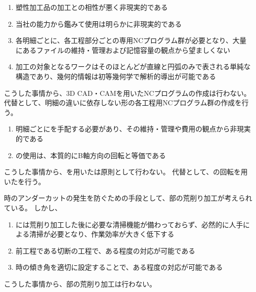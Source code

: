 \begin{enumerate}[label*=\alph*)]
\item {}塑性加工品の加工との相性が悪く非現実的である
\item 当社の能力から鑑みて使用は明らかに非現実的である
\item 各明細ごとに、各工程部分ごとの専用NCプログラム群が必要となり、大量にあるファイルの維持・管理および記憶容量の観点から望ましくない
\item 加工の対象となるワークはそのほとんどが直線と円弧のみで表される単純な構造であり、幾何的情報は初等幾何学で解析的導出が可能である
\end{enumerate}
こうした事情から、3D CAD・CAMを用いたNCプログラムの作成は行わない。
代替として、明細の違いに依存しない形の各工程用NCプログラム群の作成を行う。


\clearpage
\begin{enumerate}[label*=\alph*)]
\item {}明細ごとに\Spacer を手配する必要があり、その維持・管理や費用の観点から非現実的である
\item \Spacer の使用は、本質的にB軸方向の回転と等価である
\end{enumerate}
こうした事情から、\Spacer を用いた\AlocationAdjustment は原則として行わない。
代替として、\Table の回転を用いた\AlocationAdjustment を行う。



\DimpleMilling 時のアンダーカットの発生を防ぐための手段として、\EndFace 部の荒削り加工が考えられている。
しかし、
\begin{enumerate}[label*=\alph*)]
\item \DMC には荒削り加工した後に必要な清掃機能が備わっておらず、必然的に人手による清掃が必要となり、作業効率が大きく低下する
\item 前工程である切断の工程で、ある程度の対応が可能である
\item \DimpleMilling 時の傾き角を適切に設定することで、ある程度の対応が可能である
\end{enumerate}
こうした事情から、\EndFace 部の荒削り加工は行わない。



